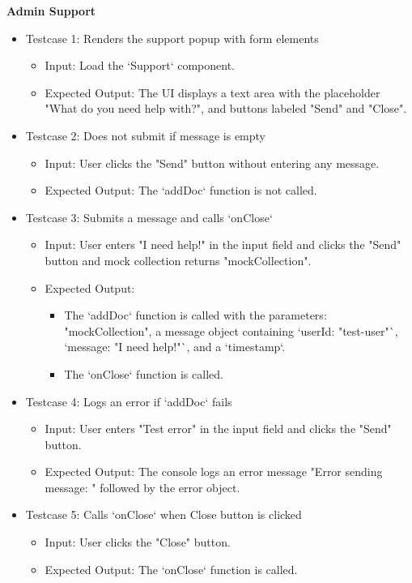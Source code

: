 \noindent
\textbf{Admin Support}
\begin{itemize}
    \item Testcase 1: Renders the support popup with form elements
    \begin{itemize}
        \item Input: Load the `Support` component.
        \item Expected Output: The UI displays a text area with the placeholder "What do you need help with?", and buttons labeled "Send" and "Close".
    \end{itemize}

    \item Testcase 2: Does not submit if message is empty
    \begin{itemize}
        \item Input: User clicks the "Send" button without entering any message.
        \item Expected Output: The `addDoc` function is not called.
    \end{itemize}

    \item Testcase 3: Submits a message and calls `onClose`
    \begin{itemize}
        \item Input: User enters "I need help!" in the input field and clicks the "Send" button and mock collection returns "mockCollection".
        \item Expected Output: 
            \begin{itemize}
                \item The `addDoc` function is called with the parameters: "mockCollection", a message object containing `userId: "test-user"`, `message: "I need help!"`, and a `timestamp`.
                \item The `onClose` function is called.
            \end{itemize}
    \end{itemize}

    \item Testcase 4: Logs an error if `addDoc` fails
    \begin{itemize}
        \item Input: User enters "Test error" in the input field and clicks the "Send" button.
        \item Expected Output: The console logs an error message "Error sending message: " followed by the error object.
    \end{itemize}

    \item Testcase 5: Calls `onClose` when Close button is clicked
    \begin{itemize}
        \item Input: User clicks the "Close" button. 
        \item Expected Output: The `onClose` function is called.
    \end{itemize}
\end{itemize}

